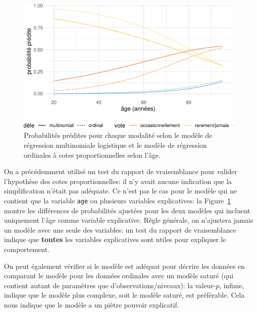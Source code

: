 \documentclass[
  11pt,
  letterpaper,
]{scrbook}
\theoremstyle{definition}
\theoremstyle{remark}
\begin{document}
\begin{figure}[ht!]

{\centering \includegraphics{./05-reglogistique_files/figure-pdf/fig-predmultinom-1.pdf}

}

\caption{\label{fig-predmultinom}Probabilités prédites pour chaque
modalité selon le modèle de régression multinomiale logistique et le
modèle de régression ordinales à cotes proportionnelles selon l'âge.}

\end{figure}

On a précédemment utilisé un test du rapport de vraisemblance pour
valider l'hypothèse des cotes proportionnelles: il n'y avait aucune
indication que la simplification n'était pas adéquate. Ce n'est pas le
cas pour le modèle qui ne contient que la variable \texttt{age} ou
plusieurs variables explicatives: la Figure~\ref{fig-predmultinom}
montre les différences de probabilités ajustées pour les deux modèles
qui incluent uniquement l'âge comme variable explicative. Règle
générale, on n'ajustera jamais un modèle avec une seule des variables:
un test du rapport de vraisemblance indique que \textbf{toutes} les
variables explicatives sont utiles pour expliquer le comportement.

On peut également vérifier si le modèle est adéquat pour décrire les
données en comparant le modèle pour les données ordinales avec un modèle
saturé (qui contient autant de paramètres que d'observations/niveaux):
la valeur-\(p\), infime, indique que le modèle plus complexe, soit le
modèle saturé, est préférable. Cela nous indique que le modèle a un
piètre pouvoir explicatif.
\end{document}
